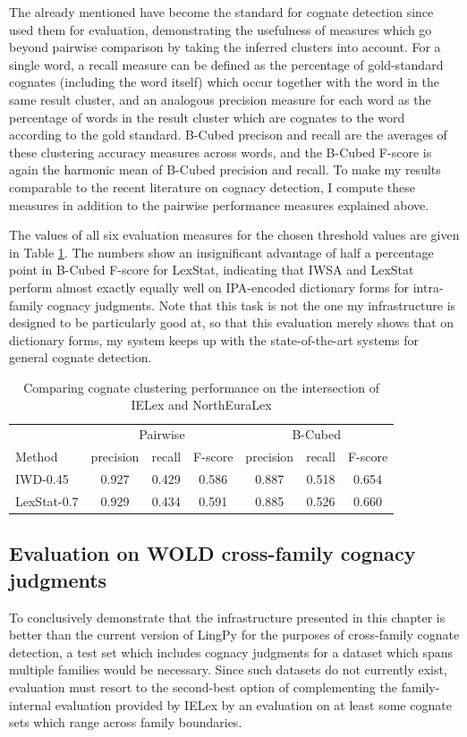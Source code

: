 The already mentioned  have become the standard for cognate detection since \cite{hauer_kondrak_2011} used them for evaluation, demonstrating the usefulness of measures which go beyond pairwise comparison by taking the inferred clusters into account. For a single word, a recall measure can be defined as the percentage of gold-standard cognates (including the word itself) which occur together with the word in the same result cluster, and an analogous precision measure for each word as the percentage of words in the result cluster which are cognates to the word according to the gold standard. B-Cubed precison and recall are the averages of these clustering accuracy measures across words, and the B-Cubed F-score is again the harmonic mean of B-Cubed precision and recall. To make my results comparable to the recent literature on cognacy detection, I compute these measures in addition to the pairwise performance measures explained above.

The values of all six evaluation measures for the chosen threshold values are given in Table \ref{lingpyComparisonIELex}. The numbers show an insignificant advantage of half a percentage point in B-Cubed F-score for LexStat, indicating that IWSA and LexStat perform almost exactly equally well on IPA-encoded dictionary forms for intra-family cognacy judgments. Note that this task is not the one my infrastructure is designed to be particularly good at, so that this evaluation merely shows that on dictionary forms, my system keeps up with the state-of-the-art systems for general cognate detection.

\begin{table}
 \centering
\begin{tabular}{lcccccc}
  \hline \hline
  & \multicolumn{3}{c}{Pairwise} & \multicolumn{3}{c}{B-Cubed}\\
  Method & precision & recall & F-score & precision & recall & F-score\\ \hline
  IWD-0.45 & 0.927 & 0.429 & 0.586 & 0.887 & 0.518 & 0.654\\
  LexStat-0.7 & 0.929 & 0.434 & 0.591 & 0.885 & 0.526 & 0.660\\
  \hline
 \end{tabular}
 \caption{Comparing cognate clustering performance on the intersection of IELex and NorthEuraLex}
 \label{lingpyComparisonIELex}
\end{table}

\subsection{Evaluation on WOLD cross-family cognacy judgments}
To conclusively demonstrate that the infrastructure presented in this chapter is better than the current version of LingPy for the purposes of cross-family cognate detection, a test set which includes cognacy judgments for a dataset which spans multiple families would be necessary. Since such datasets do not currently exist, evaluation must resort to the second-best option of complementing the family-internal evaluation provided by IELex by an evaluation on at least some cognate sets which range across family boundaries.

